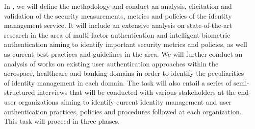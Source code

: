 \begin{Workpackage}{\thewpno}
\begin{WPDescription}
\end{WPDescription}

\begin{Task}

\TaskResults{%
}
\TaskHeader{}

In \theTask, we will define the methodology and conduct an analysis, elicitation and validation of the security measurements, metrics and policies of the identity management service. It will include an extensive analysis on state-of-the-art research in the area of multi-factor authentication and intelligent biometric authentication aiming to identify important security metrics and policies, as well as current best practices and guidelines in the area. We will further conduct an analysis of works on existing user authentication approaches within the aerospace, healthcare and banking domains in order to identify the peculiarities of identity management in each domain. The task will also entail a series of semi-structured interviews that will be conducted with various stakeholders at the end-user organizations aiming to identify current identity management and user authentication practices, policies and procedures followed at each organization. This task will proceed in three phases. 
\end{Task}

\begin{Task}

\TaskResults{%
}
\TaskHeader{}


\end{Task}
\end{Workpackage}
